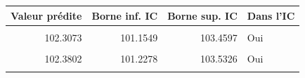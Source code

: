 \centering
\centering
\begin{tabular}[t]{rrrl}
\toprule
Valeur prédite & Borne inf. IC & Borne sup. IC & Dans l'IC\\
\midrule
\cellcolor{gray!10}{102.3268} & \cellcolor{gray!10}{101.1744} & \cellcolor{gray!10}{103.4792} & \cellcolor{gray!10}{Oui}\\
102.3073 & 101.1549 & 103.4597 & Oui\\
\cellcolor{gray!10}{102.2141} & \cellcolor{gray!10}{101.0617} & \cellcolor{gray!10}{103.3665} & \cellcolor{gray!10}{Oui}\\
102.3802 & 101.2278 & 103.5326 & Oui\\
\cellcolor{gray!10}{NA} & \cellcolor{gray!10}{NA} & \cellcolor{gray!10}{NA} & \cellcolor{gray!10}{100\% (4/4)\}}\\
\bottomrule
\end{tabular}

